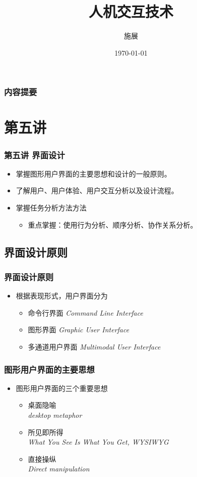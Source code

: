\documentclass{beamer}
\title{人机交互技术}
\author{施展}
\institute{华中科技大学~武汉光电国家实验室}
\date{\today}
\begin{document}
\begin{frame}
	\titlepage
\end{frame}

\begin{frame}
	\frametitle{内容提要}
	\tableofcontents
\end{frame}

\section{第五讲}
\begin{frame}
	\frametitle{第五讲 界面设计}
	\begin{itemize}
		\item 掌握图形用户界面的主要思想和设计的一般原则。
		\item 了解用户、用户体验、用户交互分析以及设计流程。
		\item 掌握任务分析方法方法
		\begin{itemize}
			\item 重点掌握：使用行为分析、顺序分析、协作关系分析。
		\end{itemize}
	\end{itemize}
\end{frame}

\subsection{界面设计原则}
\begin{frame}
	\frametitle{界面设计原则}
	\begin{itemize}
		\item 根据表现形式，用户界面分为
		\begin{itemize}
			\item 命令行界面 \textit{Command Line Interface}
			\item 图形界面 \textit{Graphic User Interface}
			\item 多通道用户界面 \textit{Multimodal User Interface}
		\end{itemize}
	\end{itemize}
\end{frame}

\begin{frame}
	\frametitle{图形用户界面的主要思想}
	\begin{itemize}
		\item 图形用户界面的三个重要思想
		\begin{itemize}
			\item 桌面隐喻\\\textit{desktop metaphor}
			\item 所见即所得\\\textit{What You See Is What You Get, WYSIWYG}
			\item 直接操纵\\\textit{Direct manipulation}
		\end{itemize}
	\end{itemize}
\end{frame}
\end{document}

